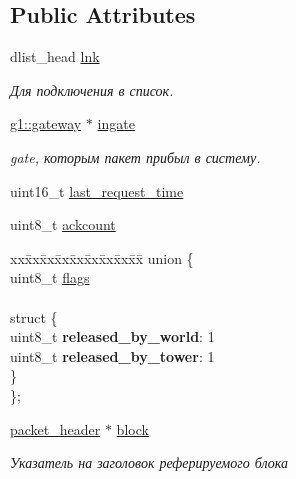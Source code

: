 \subsection*{Public Attributes}
\begin{DoxyCompactItemize}
\item 
dlist\+\_\+head \hyperlink{structg1_1_1packet_ad385dbb95d429aa9616059bd374b359b}{lnk}\hypertarget{structg1_1_1packet_ad385dbb95d429aa9616059bd374b359b}{}\label{structg1_1_1packet_ad385dbb95d429aa9616059bd374b359b}

\begin{DoxyCompactList}\small\item\em Для подключения в список. \end{DoxyCompactList}\item 
\hyperlink{structg1_1_1gateway}{g1\+::gateway} $\ast$ \hyperlink{structg1_1_1packet_ae5b9f8200d6c128cd9a4a436c1f8d1dc}{ingate}\hypertarget{structg1_1_1packet_ae5b9f8200d6c128cd9a4a436c1f8d1dc}{}\label{structg1_1_1packet_ae5b9f8200d6c128cd9a4a436c1f8d1dc}

\begin{DoxyCompactList}\small\item\em gate, которым пакет прибыл в систему. \end{DoxyCompactList}\item 
uint16\+\_\+t \hyperlink{structg1_1_1packet_adeb6ae81faca9970d09c848a793d2a9f}{last\+\_\+request\+\_\+time}
\item 
uint8\+\_\+t \hyperlink{structg1_1_1packet_a18df7f0ed915a9b7901c73afce275f87}{ackcount}
\item 
\begin{tabbing}
xx\=xx\=xx\=xx\=xx\=xx\=xx\=xx\=xx\=\kill
union \{\\
\>uint8\_t \hyperlink{structg1_1_1packet_aeb31a298732861167f07f7ae38e25c07}{flags}\\
\>\\
\>struct \{\\
\>\>uint8\_t {\bfseries released\_by\_world}: 1\\
\>\>uint8\_t {\bfseries released\_by\_tower}: 1\\
\>\} \hypertarget{uniong1_1_1packet_1_1_0D4_a13673b76b09c9f880f62f539488b7117}{}\label{uniong1_1_1packet_1_1_0D4_a13673b76b09c9f880f62f539488b7117}
\\
\}; \hypertarget{structg1_1_1packet_af94d16abf234fdcfb447b00ed332ba9d}{}\label{structg1_1_1packet_af94d16abf234fdcfb447b00ed332ba9d}
\\

\end{tabbing}\item 
\hyperlink{structg1_1_1packet__header}{packet\+\_\+header} $\ast$ \hyperlink{structg1_1_1packet_a0647831e03bcc456f9d4349ac4db440e}{block}\hypertarget{structg1_1_1packet_a0647831e03bcc456f9d4349ac4db440e}{}\label{structg1_1_1packet_a0647831e03bcc456f9d4349ac4db440e}

\begin{DoxyCompactList}\small\item\em Указатель на заголовок реферируемого блока \end{DoxyCompactList}\end{DoxyCompactItemize}


